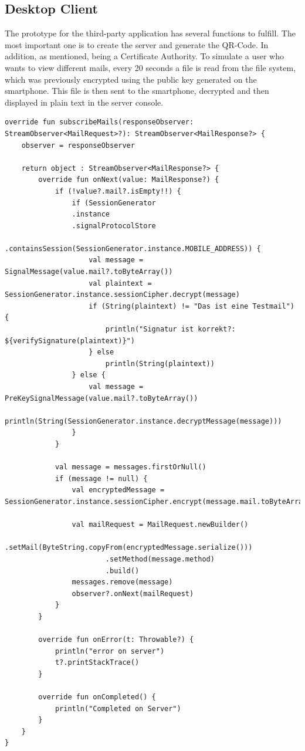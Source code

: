 \documentclass[12pt,oneside,a4paper,parskip]{scrbook}
\begin{document}
\subsection{Desktop Client}
The prototype for the third-party application has several functions to fulfill. The most important one is to create the server and generate the QR-Code. In addition, as mentioned, being a Certificate Authority. To simulate a user who wants to view different mails, every 20 seconds a file is read from the file system, which was previously encrypted using the public key generated on the smartphone. This file is then sent to the smartphone, decrypted and then displayed in plain text in the server console. 

\begin{lstlisting}
override fun subscribeMails(responseObserver: StreamObserver<MailRequest>?): StreamObserver<MailResponse?> {
    observer = responseObserver
    
    return object : StreamObserver<MailResponse?> {
        override fun onNext(value: MailResponse?) {
            if (!value?.mail?.isEmpty!!) {
                if (SessionGenerator
                .instance
                .signalProtocolStore
                .containsSession(SessionGenerator.instance.MOBILE_ADDRESS)) {
                    val message = SignalMessage(value.mail?.toByteArray())
                    val plaintext = SessionGenerator.instance.sessionCipher.decrypt(message)
                    if (String(plaintext) != "Das ist eine Testmail") {
                        println("Signatur ist korrekt?: ${verifySignature(plaintext)}")
                    } else
                        println(String(plaintext))
                } else {
                    val message = PreKeySignalMessage(value.mail?.toByteArray())
                    println(String(SessionGenerator.instance.decryptMessage(message)))
                }
            }
    
            val message = messages.firstOrNull()
            if (message != null) {
                val encryptedMessage = SessionGenerator.instance.sessionCipher.encrypt(message.mail.toByteArray())
    
                val mailRequest = MailRequest.newBuilder()
                        .setMail(ByteString.copyFrom(encryptedMessage.serialize()))
                        .setMethod(message.method)
                        .build()
                messages.remove(message)
                observer?.onNext(mailRequest)
            }
        }
    
        override fun onError(t: Throwable?) {
            println("error on server")
            t?.printStackTrace()
        }
    
        override fun onCompleted() {
            println("Completed on Server")
        }
    }
}
\end{lstlisting}
\end{document}
